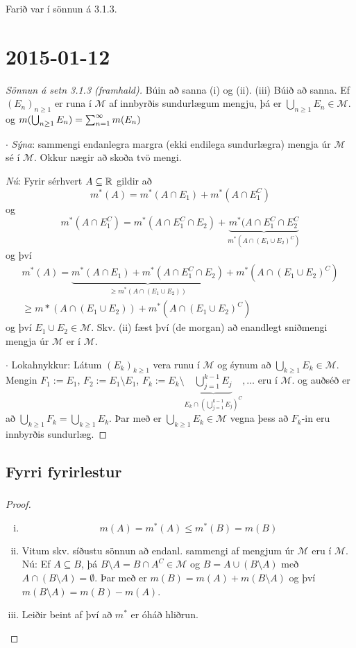 \documentclass[12pt]{book}
\newcommand{\cM}{\mathcal{M}}
\begin{document}
Farið var í sönnun á 3.1.3.

\chapter{2015-01-12}

\begin{proof}[Sönnun á setn 3.1.3 (framhald)]
  
Búin að sanna (i) og (ii). (iii) Búið að sanna. Ef $(E_n)_{n \geq 1}$ er runa í $\cM$
af innbyrðis sundurlægum mengju, þá er $\bigcup_{n \geq 1} E_n \in \cM$.
og $m(\bigcup_{n \geq 1} E_n) = \sum_{n = 1}^{\infty} m (E_n)$

$\cdot$ \emph{Sýna}: sammengi endanlegra margra (ekki endilega sundurlægra) mengja úr $\cM$ sé í $\cM$.
Okkur nægir að skoða tvö mengi.

\emph{Nú}: Fyrir sérhvert $A \subseteq \mathbb{R}$
 gildir að \[m^*(A) = m^*(A \cap E_1) + m^*(A \cap E_1^C)\]
 og \[m^*(A \cap E_1^C)  = m^*(A \cap E_1^C \cap E_2) + \underbrace{m^*(A \cap E_1^C \cap E_2^C}_{m^*(A \cap (E_1 \cup E_2)^C)}\]
 og því
 \begin{gather*}
   m^*(A) = \underbrace{m^*(A \cap E_1) + m^*(A \cap E_1^C \cap
     E_2)}_{\geq m^*(A \cap (E_1 \cup E_2))} + m^*(A \cap (E_1 \cup E_2)^C)\\
    \geq m*(A \cap (E_1 \cup E_2)) + m^*(A \cap (E_1 \cup E_2)^C)
  \end{gather*}
  og því $E_1 \cup E_2 \in \cM$.
  Skv. (ii) fæst því (de morgan) að enandlegt sniðmengi mengja úr $\cM$ er í $\cM$.

  $\cdot$ Lokahnykkur: Látum $(E_k)_{k \geq 1}$ vera runu í $\cM$ og śynum að
  $\bigcup_{k \geq 1} E_k \in \cM$. Mengin $F_1 := E_1$, $F_2 := E_1 \setminus E_1$,
  $F_k := E_k \setminus \underbrace{\bigcup_{j=1}^{k-1} E_j}_{E_k \cap (\bigcup_{j=1}^{k-1} E_j)^C}, \dotsc$ eru í $\cM$.
  og auðséð er að $\bigcup_{k \geq 1} F_k = \bigcup_{k \geq 1} E_k$. Þar með
  er $\bigcup_{k \geq 1} E_k \in \cM$ vegna þess að $F_k$-in eru innbyrðis sundurlæg.
\end{proof}

\section{Fyrri fyrirlestur}
\subsection{}
\begin{proof}
  \begin{enumerate}[(i)]
  \item \[ m(A) = m^*(A) \leq m^*(B) = m(B) \]
  \item Vitum skv. síðustu sönnun að endanl. sammengi af mengjum úr $\cM$ eru
    í $\cM$.
    Nú: Ef $A \subseteq B$, þá $B \setminus A = B \cap A^C \in \cM$
    og $B = A \cup (B \setminus A)$ með $A \cap (B \setminus A) = \emptyset$.
    Þar með er $m(B) = m(A) + m(B \setminus A)$ og því
    $m(B \setminus A) = m(B) - m(A)$.

  \item Leiðir beint af því að $m^*$ er óháð hliðrun.
  \end{enumerate}
\end{proof}
\end{document}
